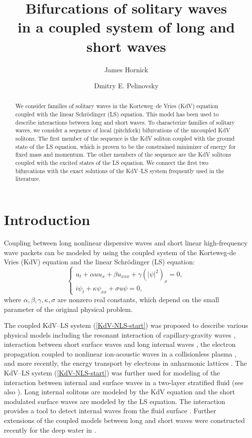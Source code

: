 \documentclass[12pt,reqno]{amsart}
\title[Bifurcations of coupled solitary waves]{Bifurcations of solitary waves \\ 
in a coupled system of long and short waves}
\author[J. Hornick]{James Hornick}
\author[D. E. Pelinovsky]{Dmitry E. Pelinovsky}
\numberwithin{equation}{section}
\begin{document}
\maketitle


\begin{abstract}
	We consider families of solitary waves in the Korteweg--de Vries (KdV) equation coupled with the linear Schr\"{o}dinger (LS) equation. This model has been used to describe interactions between long and short waves. To characterize families of solitary waves, we consider a sequence of local (pitchfork) bifurcations of the uncoupled KdV solitons. The first member of the sequence is the KdV soliton coupled with the ground state of the LS equation, which is proven to be the constrained minimizer of energy for fixed mass and momentum. The other members of the sequence are the KdV solitons coupled with the excited states of the LS equation. We connect the first two bifurcations with the exact solutions of the KdV--LS system frequently used in the literature. 
\end{abstract}

\section{Introduction} 

Coupling between long nonlinear dispersive waves and short linear high-frequency wave packets can be modeled by using the coupled system of the Korteweg-de Vries (KdV) equation and the linear Schr\"{o}dinger (LS) equation:
\begin{equation}
\label{KdV-NLS-start}
\begin{cases}
u_t+\alpha uu_x+\beta u_{xxx}+\gamma (\vert \psi\vert^2)_x=0, \\
i\psi_t+\kappa \psi_{xx}+\sigma u\psi = 0,
\end{cases}
\end{equation}
where \(\alpha, \beta, \gamma, \kappa, \sigma\) are nonzero real constants, which depend on the small parameter of the original physical problem. 

The coupled KdV--LS system (\ref{KdV-NLS-start}) was proposed to describe various physical models including the resonant interaction of capillary-gravity waves \cite{kaw}, interaction between short surface waves and long internal waves \cite{Hashizume1980}, the electron propagation coupled to nonlinear ion-acoustic waves in a collisionless plasma \cite{Nish}, and more recently, the energy transport by electrons in anharmonic lattices \cite{Cis}. The KdV--LS system (\ref{KdV-NLS-start}) was further used for modeling of the interaction between internal and surface waves in a two-layer stratified fluid 
\cite{Sul,Sul15} (see also \cite{Choi}). Long internal solitons are modeled by the KdV equation and the short modulated surface waves are modeled by the LS equation. The interaction provides a tool to detect internal waves from the fluid surface \cite{Sul}. Further extensions of the coupled models between long and short waves  were constructed recently for the deep water in \cite{Sul24}.
\end{document}

